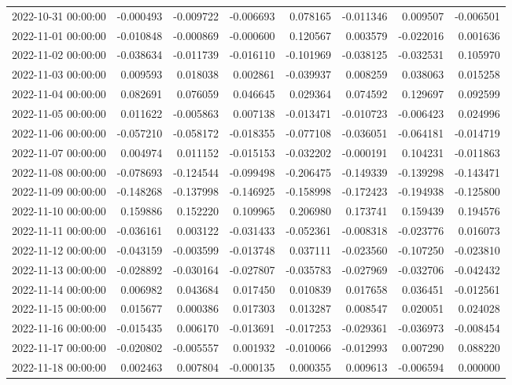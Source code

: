 \begin{tabular}{lrrrrrrr}
2022-10-31 00:00:00 & -0.000493 & -0.009722 & -0.006693 & 0.078165 & -0.011346 & 0.009507 & -0.006501 \\
2022-11-01 00:00:00 & -0.010848 & -0.000869 & -0.000600 & 0.120567 & 0.003579 & -0.022016 & 0.001636 \\
2022-11-02 00:00:00 & -0.038634 & -0.011739 & -0.016110 & -0.101969 & -0.038125 & -0.032531 & 0.105970 \\
2022-11-03 00:00:00 & 0.009593 & 0.018038 & 0.002861 & -0.039937 & 0.008259 & 0.038063 & 0.015258 \\
2022-11-04 00:00:00 & 0.082691 & 0.076059 & 0.046645 & 0.029364 & 0.074592 & 0.129697 & 0.092599 \\
2022-11-05 00:00:00 & 0.011622 & -0.005863 & 0.007138 & -0.013471 & -0.010723 & -0.006423 & 0.024996 \\
2022-11-06 00:00:00 & -0.057210 & -0.058172 & -0.018355 & -0.077108 & -0.036051 & -0.064181 & -0.014719 \\
2022-11-07 00:00:00 & 0.004974 & 0.011152 & -0.015153 & -0.032202 & -0.000191 & 0.104231 & -0.011863 \\
2022-11-08 00:00:00 & -0.078693 & -0.124544 & -0.099498 & -0.206475 & -0.149339 & -0.139298 & -0.143471 \\
2022-11-09 00:00:00 & -0.148268 & -0.137998 & -0.146925 & -0.158998 & -0.172423 & -0.194938 & -0.125800 \\
2022-11-10 00:00:00 & 0.159886 & 0.152220 & 0.109965 & 0.206980 & 0.173741 & 0.159439 & 0.194576 \\
2022-11-11 00:00:00 & -0.036161 & 0.003122 & -0.031433 & -0.052361 & -0.008318 & -0.023776 & 0.016073 \\
2022-11-12 00:00:00 & -0.043159 & -0.003599 & -0.013748 & 0.037111 & -0.023560 & -0.107250 & -0.023810 \\
2022-11-13 00:00:00 & -0.028892 & -0.030164 & -0.027807 & -0.035783 & -0.027969 & -0.032706 & -0.042432 \\
2022-11-14 00:00:00 & 0.006982 & 0.043684 & 0.017450 & 0.010839 & 0.017658 & 0.036451 & -0.012561 \\
2022-11-15 00:00:00 & 0.015677 & 0.000386 & 0.017303 & 0.013287 & 0.008547 & 0.020051 & 0.024028 \\
2022-11-16 00:00:00 & -0.015435 & 0.006170 & -0.013691 & -0.017253 & -0.029361 & -0.036973 & -0.008454 \\
2022-11-17 00:00:00 & -0.020802 & -0.005557 & 0.001932 & -0.010066 & -0.012993 & 0.007290 & 0.088220 \\
2022-11-18 00:00:00 & 0.002463 & 0.007804 & -0.000135 & 0.000355 & 0.009613 & -0.006594 & 0.000000 \\

\end{tabular}
